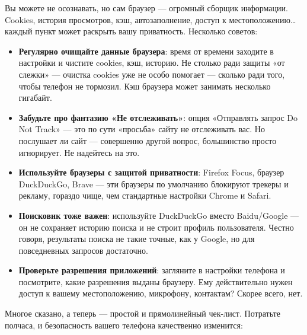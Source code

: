
Вы можете не осознавать, но сам браузер — огромный сборщик информации. Cookies, история просмотров, кэш, автозаполнение, доступ к местоположению… каждый пункт может раскрыть вашу приватность. Несколько советов:

\begin{itemize}
  \item \textbf{Регулярно очищайте данные браузера}: время от времени заходите в настройки и чистите cookies, кэш, историю. Не столько ради защиты «от слежки» — очистка cookies уже не особо помогает — сколько ради того, чтобы телефон не тормозил. Кэш браузера может занимать несколько гигабайт.
  \item \textbf{Забудьте про фантазию «Не отслеживать»}: опция «Отправлять запрос Do Not Track» — это по сути «просьба» сайту не отслеживать вас. Но послушает ли сайт — совершенно другой вопрос, большинство просто игнорирует. Не надейтесь на это.
  \item \textbf{Используйте браузеры с защитой приватности}: Firefox Focus, браузер DuckDuckGo, Brave — эти браузеры по умолчанию блокируют трекеры и рекламу, гораздо чище, чем стандартные настройки Chrome и Safari.
  \item \textbf{Поисковик тоже важен}: используйте DuckDuckGo вместо Baidu/Google — он не сохраняет историю поиска и не строит профиль пользователя. Честно говоря, результаты поиска не такие точные, как у Google, но для повседневных запросов достаточно.
  \item \textbf{Проверьте разрешения приложений}: загляните в настройки телефона и посмотрите, какие разрешения выданы браузеру. Ему действительно нужен доступ к вашему местоположению, микрофону, контактам? Скорее всего, нет.
\end{itemize}


Многое сказано, а теперь — простой и прямолинейный чек-лист. Потратьте полчаса, и безопасность вашего телефона качественно изменится:

